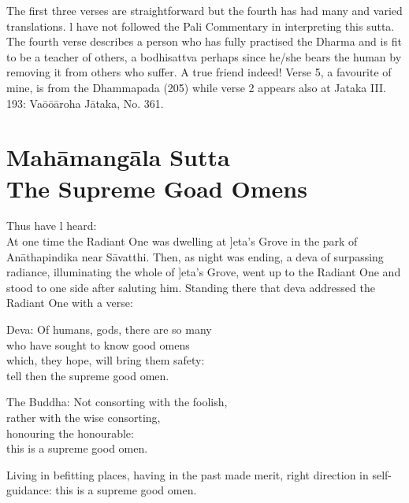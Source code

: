The ﬁrst three verses are straightforward but the fourth has had many and varied translations. l have not followed the Pali Commentary in interpreting this sutta. The fourth verse describes a person who has fully practised the Dharma and is ﬁt to be a teacher of others, a bodhisattva perhaps since he/she bears the human by removing it from others who suffer. A true friend indeed! Verse 5, a favourite of mine, is from the Dhammapada (205) while verse 2 appears also at Jataka III. 193: Va\=o\=o\=aroha J\=ataka, No. 361.\\

\chapter{Mah\=amang\=ala Sutta\\ The Supreme Goad Omens}
Thus have l heard:\\
\newline
At one time the Radiant One was dwelling at ]eta's Grove in the park of An\=athapindika near S\=avatthi. Then, as night was ending, a deva of surpassing radiance, illuminating the whole of ]eta's Grove, went up to the Radiant One and stood to one side after saluting him. Standing there that deva addressed the Radiant One with a verse:

\begin{MyDescription}{Deva:}
Of humans, gods, there are so many\\
who have sought to know good omens\\
which, they hope, will bring them safety:\\
tell then the supreme good omen.
\end{MyDescription}

\begin{MyDescription}{The Buddha:}
Not consorting with the foolish,\\
rather with the wise consorting,\\
honouring the honourable:\\
this is a supreme good omen.
\end{MyDescription}
    
\begin{MyDescription}{}
Living in befitting places,
having in the past made merit,
right direction in self-guidance:
this is a supreme good omen.
\end{MyDescription}

